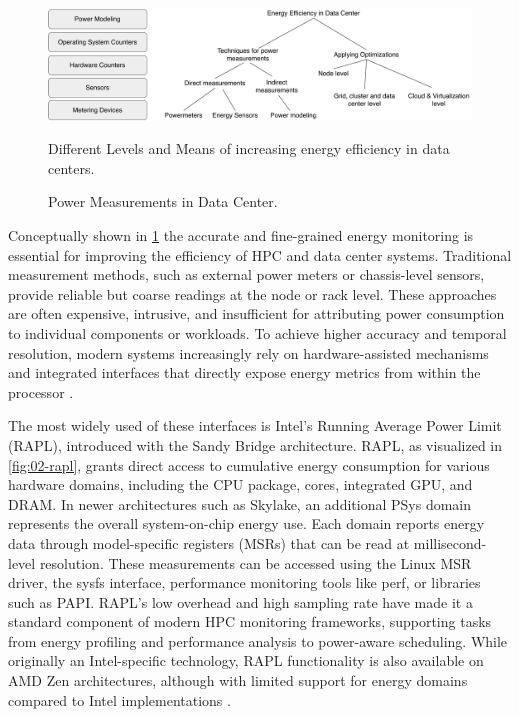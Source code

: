 \begin{figure}[H]
    \centering
    \includegraphics[scale=0.4]{fig/02/02-energy-overview.pdf}
    \caption{Power Measurements in Data Center.}
    \label{fig:02-energy-overview}
    \tiny
    Different Levels and Means of increasing energy efficiency in data centers.
\end{figure}

Conceptually shown in \ref{fig:02-energy-overview} the accurate and fine-grained energy monitoring is essential for improving the efficiency of HPC and data center systems. Traditional measurement methods, such as external power meters or chassis-level sensors, provide reliable but coarse readings at the node or rack level. These approaches are often expensive, intrusive, and insufficient for attributing power consumption to individual components or workloads. To achieve higher accuracy and temporal resolution, modern systems increasingly rely on hardware-assisted mechanisms and integrated interfaces that directly expose energy metrics from within the processor \cite{khan2018energy}.

The most widely used of these interfaces is Intel's Running Average Power Limit (RAPL), introduced with the Sandy Bridge architecture. RAPL, as visualized in \ref{fig:02-rapl}, grants direct access to cumulative energy consumption for various hardware domains, including the CPU package, cores, integrated GPU, and DRAM. In newer architectures such as Skylake, an additional PSys domain represents the overall system-on-chip energy use. Each domain reports energy data through model-specific registers (MSRs) that can be read at millisecond-level resolution. These measurements can be accessed using the Linux MSR driver, the sysfs interface, performance monitoring tools like perf, or libraries such as PAPI. RAPL's low overhead and high sampling rate have made it a standard component of modern HPC monitoring frameworks, supporting tasks from energy profiling and performance analysis to power-aware scheduling. While originally an Intel-specific technology, RAPL functionality is also available on AMD Zen architectures, although with limited support for energy domains compared to Intel implementations \cite{khan2018energy}.

